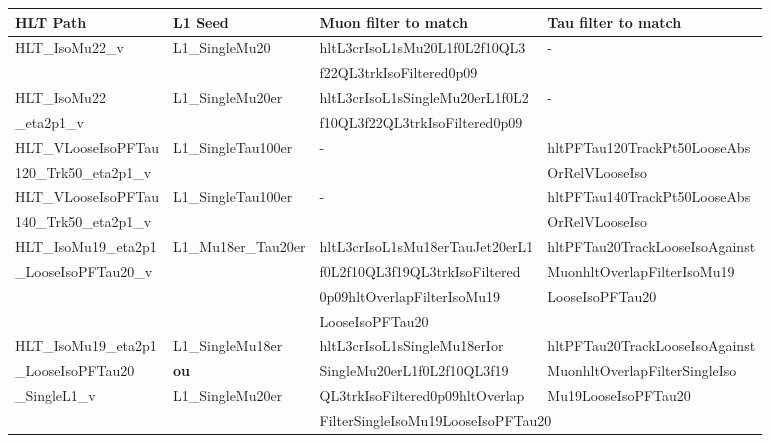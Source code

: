 {\footnotesize
\begin{tabularx}{\textwidth}{llXX}
\toprule
HLT Path & L1 Seed & Muon filter to match & Tau filter to match \\
\midrule
HLT\_IsoMu22\_v
&
L1\_SingleMu20
&
hltL3crIsoL1sMu20L1f0L2f10QL3
&
-
\\
&
&
f22QL3trkIsoFiltered0p09
\\\hline
HLT\_IsoMu22
&
L1\_SingleMu20er
&
hltL3crIsoL1sSingleMu20erL1f0L2\!
&
-
\\
\_eta2p1\_v
&
&
f10QL3f22QL3trkIsoFiltered0p09
\\\hline
HLT\_VLooseIsoPFTau
&
L1\_SingleTau100er
&
-
&
hltPFTau120TrackPt50LooseAbs
\\
120\_Trk50\_eta2p1\_v
&
&
&
OrRelVLooseIso
\\\hline
HLT\_VLooseIsoPFTau
&
L1\_SingleTau100er
&
-
&
hltPFTau140TrackPt50LooseAbs
\\
140\_Trk50\_eta2p1\_v
&
&
&
OrRelVLooseIso
\\\hline
HLT\_IsoMu19\_eta2p1
&
L1\_Mu18er\_Tau20er\!
&
hltL3crIsoL1sMu18erTauJet20erL1
&
hltPFTau20TrackLooseIsoAgainst
\\
\_LooseIsoPFTau20\_v
&
&
f0L2f10QL3f19QL3trkIsoFiltered
&
MuonhltOverlapFilterIsoMu19
\\
&
&
0p09hltOverlapFilterIsoMu19
&
LooseIsoPFTau20
\\
&
&
LooseIsoPFTau20
\\\hline
HLT\_IsoMu19\_eta2p1
&
L1\_SingleMu18er
&
hltL3crIsoL1sSingleMu18erIor
&
hltPFTau20TrackLooseIsoAgainst
\\
\_LooseIsoPFTau20
&
\textbf{ou}
&
SingleMu20erL1f0L2f10QL3f19
&
MuonhltOverlapFilterSingleIso
\\
\_SingleL1\_v
&
L1\_SingleMu20er
&
QL3trkIsoFiltered0p09hltOverlap
&
Mu19LooseIsoPFTau20
\\
&
&
\multicolumn{2}{l}{FilterSingleIsoMu19LooseIsoPFTau20}
\\
\bottomrule
\end{tabularx}
}
